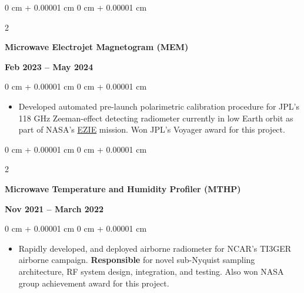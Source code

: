 \documentclass[10pt, letterpaper]{article}
\newenvironment{highlights}{
    \begin{itemize}[
        topsep=0.10 cm,
        parsep=0.10 cm,
        partopsep=0pt,
        itemsep=0pt,
        leftmargin=0 cm + 10pt     
    ]
}{
    \end{itemize}
} %
\newenvironment{onecolentry}{
    \begin{adjustwidth}{
        0 cm + 0.00001 cm
    }{
        0 cm + 0.00001 cm
    }
}{
    \end{adjustwidth}
} %
\newenvironment{twocolentry}[2][]{
    \onecolentry
    \def\secondColumn{#2}
    \setcolumnwidth{\fill, 4.5 cm}
    \begin{paracol}{2}
}{
    \switchcolumn \raggedleft \secondColumn
    \end{paracol}
    \endonecolentry
} %
\begin{document}
        \begin{twocolentry}{
            \textbf{Feb 2023 -- May 2024}
            }
            \textbf{Microwave Electrojet Magnetogram (MEM)}
            \end{twocolentry}
        \vspace{0.20 cm}
        \begin{onecolentry}
            \begin{highlights}
                \item Developed automated pre-launch polarimetric calibration procedure for JPL's 118 GHz Zeeman-effect detecting radiometer currently in low Earth orbit as part of NASA's  \href{https://science.nasa.gov/mission/ezie/}{EZIE} mission. Won JPL's Voyager award for this project.              
            \end{highlights}
        \end{onecolentry}
        \vspace{0.3cm}        
        \begin{twocolentry}{
            \textbf{Nov 2021 -- March 2022}
            }
            \textbf{Microwave Temperature and Humidity Profiler (MTHP)}
            \end{twocolentry}
        \vspace{0.20 cm}
        \begin{onecolentry}
            \begin{highlights}
                \item Rapidly developed, and deployed airborne radiometer for NCAR's TI3GER airborne campaign. \textbf{Responsible} for novel sub-Nyquist sampling architecture, RF system design, integration, and testing. Also won NASA group achievement award for this project.
            \end{highlights}
        \end{onecolentry}
        \vspace{0.3 cm}
\end{document}
